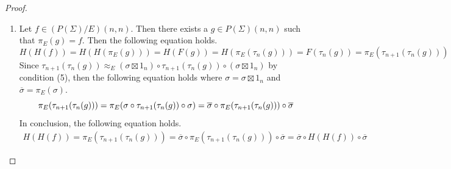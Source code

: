 \begin{proof}
\begin{enumerate}
          Then $H( f \boxtimes 1 ) = H( \pi_E( g ) \boxtimes 1 ) = H( \pi_E( g \boxtimes 1 ) ) = F( g \boxtimes 1)$.
          Since $\tau_{n+1}( g \boxtimes 1 ) \approx_E \tau_n( g ) \boxtimes 1$ by condition (4), then the following holds.
          \begin{equation*}
            H( f \boxtimes 1 )
            =
            F( g \boxtimes 1 )
            =
            \pi_E( \tau_n( g \boxtimes 1 ) )
            =
            \pi_E( \tau_n( g ) \boxtimes 1  )
            =
            \pi_E( \tau_n( g ) ) \boxtimes 1
            =
            F( g ) \boxtimes 1
            =
            H( f ) \boxtimes 1
          \end{equation*}
          Since $f$ was arbitrary, then $H( f \boxtimes 1 ) = H( f ) \boxtimes 1$ for each $f \in ( P( \Sigma ) / E )( n, n )$.
    \item Let $f \in ( P( \Sigma ) / E )( n, n )$.
          Then there exists a $g \in P( \Sigma )( n, n )$ such that $\pi_E( g ) = f$.
          Then the following equation holds.
          \begin{equation*}
              H( H( f ) )
              =
              H( H( \pi_E( g ) ) )
              =
              H( F( g ) )
              =
              H( \pi_E( \tau_n( g ) ) )
              =
              F( \tau_n( g ) )
              =
              \pi_E( \tau_{n+1}( \tau_n( g ) ) )
          \end{equation*}
          Since $\tau_{n+1}( \tau_n( g ) ) \approx_E ( \sigma \boxtimes 1_n ) \circ \tau_{n+1}( \tau_n( g ) ) \circ ( \sigma \boxtimes 1_n )$ by condition (5), then the following equation holds where $\sigma = \sigma \boxtimes 1_n$ and $\overline{\sigma} = \pi_E( \sigma )$.
          \begin{equation*}
              \pi_E( \tau_{n+1}( \tau_n( g ) ) )
              =
              \pi_E( \sigma \circ \tau_{n+1}( \tau_n( g ) ) \circ \sigma )
              \\
              =
              \overline{\sigma} \circ \pi_E( \tau_{n+1}( \tau_n( g ) ) ) \circ \overline{\sigma}
          \end{equation*}
          In conclusion, the following equation holds.
          \begin{align*}
              H( H( f ) )
              =
              \pi_E( \tau_{n+1}( \tau_n( g ) ) )
              =
              \overline{\sigma} \circ \pi_E( \tau_{n+1}( \tau_n( g ) ) ) \circ \overline{\sigma}
              =
              \overline{\sigma} \circ H( H( f ) ) \circ \overline{\sigma}

\end{align*}
\end{enumerate}
\end{proof}
